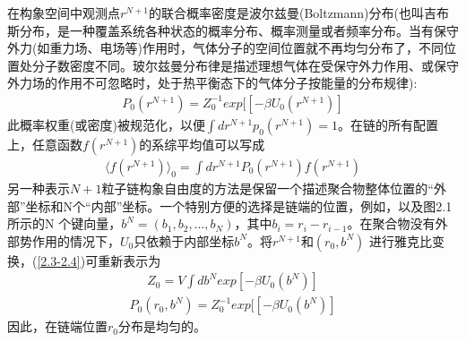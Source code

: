 在构象空间中观测点$r^{N+1}$的联合概率密度是波尔兹曼(Boltzmann)分布(也叫吉布斯分布，是一种覆盖系统各种状态的概率分布、概率测量或者频率分布。当有保守外力(如重力场、电场等)作用时，气体分子的空间位置就不再均匀分布了，不同位置处分子数密度不同。玻尔兹曼分布律是描述理想气体在受保守外力作用、或保守外力场的作用不可忽略时，处于热平衡态下的气体分子按能量的分布规律):\\
\begin{gather}
P_0(r^{N+1})=Z_{0}^{-1}exp[[-\beta U_{0}(r^{N+1})]
\label{2.4}
\end{gather}
此概率权重(或密度)被规范化，以便$\int dr^{N+1}p_0(r^{N+1})=1$。在链的所有配置上，任意函数$f(r^{N+1})$的系综平均值可以写成\\
\begin{gather}
\langle f(r^{N+1})\rangle _0 =  \int dr^{N+1}P_0(r^{N+1})f(r^{N+1})
\label{2.5}
\end{gather}
另一种表示$N+1$粒子链构象自由度的方法是保留一个描述聚合物整体位置的“外部”坐标和N个“内部”坐标。一个特别方便的选择是链端的位置，例如，以及图2.1所示的N 个键向量，$b^{N}=(b_1,b_2,\ldots,b_{N})$，其中$b_{i}=r_{i}-r_{i-1}$。在聚合物没有外部势作用的情况下，$U_0$只依赖于内部坐标$b^{N}$。将$r^{N+1}$和$(r_0,b^{N})$ 进行雅克比变换，(\ref{2.3-2.4})可重新表示为\\
\begin{gather}
Z_0 = V \int db^{N}exp[-\beta U_{0}(b^{N})]
\label{2.6}
\end{gather}
\begin{gather}
P_0(r_0,b^{N})=Z_{0}^{-1}exp[[-\beta U_{0}(b^{N})]
\label{2.7}
\end{gather}
因此，在链端位置$r_0$分布是均匀的。\\


